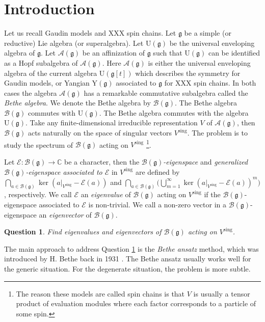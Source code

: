 \documentclass[11pt,reqno]{amsart}
\numberwithin{equation}{section}
\newtheorem{open}[thm]{Question}
\theoremstyle{definition}
\theoremstyle{remark}
\newcommand{\C}{\mathbb{C}}
\newcommand{\mc}{\mathcal}
\newcommand{\g}{\mathfrak{g}}
\newcommand{\sing}{{\mathrm{sing}}}
\newcommand{\Ug}{\mathrm{U}(\mathfrak{g})}
\begin{document}
\section{Introduction}
Let us recall Gaudin models and XXX spin chains. Let $\g$ be a simple (or reductive) Lie algebra (or superalgebra). Let $\Ug$ be the universal enveloping algebra of $\g$. Let $\mathcal A(\g)$ be an affinization of $\g$ such that $\Ug$ can be identified as a Hopf subalgebra of $\mc A(\g)$. Here $\mathcal A(\g)$ is either the universal enveloping algebra of the current algebra $\mathrm{U}(\g[t])$ which describes the symmetry for Gaudin models, or Yangian $\mathrm{Y}(\g)$ associated to $\g$ for XXX spin chains. In both cases the algebra $\mathcal A(\g)$ has a remarkable commutative subalgebra called the \emph{Bethe algebra}. We denote the Bethe algebra by $\mathcal B(\g)$. The Bethe algebra $\mathcal B(\g)$ commutes with $\Ug$. The Bethe algebra commutes with the algebra $\Ug$. Take any finite-dimensional irreducible representation $V$ of $\mathcal A(\g)$, then $\mathcal B(\g)$ acts naturally on the space of singular vectors $V^\sing$. The problem is to study the spectrum of $\mathcal B(\g)$ acting on $V^\sing$ \footnote{The reason these models are called spin chains is that $V$ is usually a tensor product of evaluation modules where each factor corresponds to a particle of some spin.}. 

Let $\mathcal E:\mathcal B(\g)\to \C$ be a character, then the {\it $\mc B(\g)$-eigenspace} and {\it generalized $\mc B(\g)$-eigenspace associated to $\mc E$} in ${V^\sing}$ are defined by $\bigcap_{a\in \mathcal B(\g)}\ker(a|_{V^\sing}-\mathcal E(a))$ and $\bigcap_{a\in \mathcal B(\g)}\big(\bigcup_{m=1}^\infty\ker(a|_{V^\sing}-\mathcal E(a))^m\big)$, respectively. We call $\mc E$ an \emph{eigenvalue} of $\mc B(\g)$ acting on ${V^\sing}$ if the $\mc B(\g)$-eigenspace associated to $\mc E$ is non-trivial. We call a non-zero vector in a $\mc B(\g)$-eigenspace an \emph{eigenvector} of $\mc B(\g)$.

\begin{open}\label{que eigenvalues}
Find eigenvalues and eigenvectors of $\mc B(\g)$ acting on $V^\sing$.
\end{open}

The main approach to address Question \ref{que eigenvalues} is the \textit{Bethe ansatz} method, which was introduced by H. Bethe back in 1931 \cite{Be31}. The Bethe ansatz usually works well for the generic situation. For the degenerate situation, the problem is more subtle.
\end{document}
